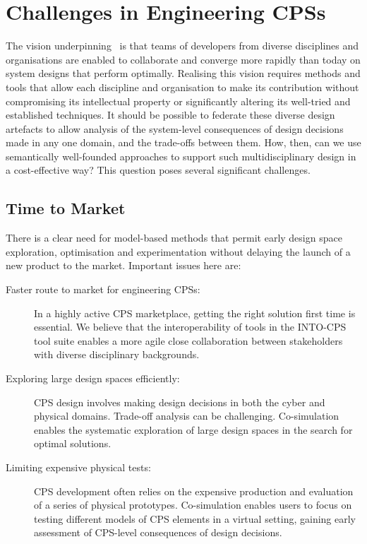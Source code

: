 \section{Challenges in Engineering CPSs}\label{sec:challenges}


The vision underpinning \into\ is that teams of developers from diverse disciplines and organisations are enabled  to collaborate and converge more rapidly than today on system designs that perform optimally. Realising this vision requires methods and tools that allow each discipline and organisation to make its contribution without compromising its intellectual property or significantly altering its well-tried and established techniques. It should be possible to federate these diverse design artefacts to allow analy\-sis of the system-level consequences of design decisions made in any one domain, and the trade-offs between them. How, then, can we use semantically well-founded approaches to support such multidisciplinary design in a cost-effective way? This question poses several significant challenges. 

\subsection{Time to Market}

There is a clear need for model-based methods that permit early design space exploration, optimisation and experimentation without delaying the launch of a new product to the market. Important issues here are:

\begin{description}
\item[Faster route to market for engineering CPSs:] In a highly active CPS marketplace, getting the right solution first time is essential. We believe that the interoperability of tools in the INTO-CPS tool suite enables a more agile close collaboration between stakeholders with diverse disciplinary backgrounds.
\item[Exploring large design spaces efficiently:] CPS design involves making design decisions in both the cyber and physical domains. Trade-off analysis can be challenging. Co-simulation enables the systematic exploration of large design spaces in the search for optimal solutions.
\item[Limiting expensive physical tests:] CPS development often relies on the expensive production and evaluation of a series of physical prototypes. Co-simulation enables users to focus on testing different models of CPS elements in a virtual setting, gaining early assessment of CPS-level consequences of design decisions.
\end{description}

